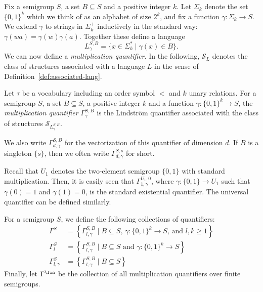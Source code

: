 \documentclass[a4paper,UKenglish,cleveref, autoref, thm-restate, anonymous]{lipics-v2021}
\begin{document}
Fix a semigroup $S$, a set $B \subseteq S$ and a positive integer $k$.  Let $\Sigma_k$ denote the set $\{0,1\}^k$ which we think of as an alphabet of size $2^k$, and fix a function $\gamma: \Sigma_k \rightarrow S$.  We extend $\gamma$ to strings in $\Sigma_k^+$ inductively in the standard way: $\gamma(wa) = \gamma(w)\gamma(a)$.  Together these define a language
$$L^{S,B}_{\gamma} = \{ x \in \Sigma_k^* \mid \gamma(x) \in B\}.$$
We can now define a \emph{multiplication quantifier}.  In the following, $\mathcal{S}_L$ denotes the class of structures associated with a language $L$ in the sense of Definition~\ref{def:associated-lang}.
\begin{definition}\label{def:multquant}
Let $\tau$ be a vocabulary including an order symbol $<$ and $k$ unary relations.
For a semigroup $S$, a set $B \subseteq S$, a positive integer $k$ and a function $\gamma: \{0,1\}^k \rightarrow S$, the \emph{multiplication quantifier} $\Gamma_{\gamma}^{S,B}$ is the Lindstr\"om quantifier associated with the class of structures $\mathcal{S}_{L^{S,B}_{\gamma}}$.

We also write $\Gamma_{d,\gamma}^{S,B}$ for the vectorization of this quantifier of dimension $d$. If $B$ is a singleton $\{s\}$, then we often write $\Gamma^{S,s}_{d,\gamma}$ for short.
\end{definition}

Recall that $U_1$ denotes the two-element semigroup $\{0,1\}$ with standard multiplication.  Then, it is easily seen that $\Gamma^{U_1,0}_{1,\gamma}$,  where $\gamma : \{0,1\} \rightarrow U_1$ such that $\gamma(0) = 1$ and $\gamma(1) = 0$, is the standard existential quantifier.  The universal quantifier can be defined similarly.


\begin{definition}
    For a semigroup $S$, we define the following collections of quantifiers: 
    \begin{align*}
        \Gamma^S &= \left\{\Gamma^{S,B}_{l,\gamma} \mid B \subseteq S \text{, } \gamma : \{0,1\}^k \rightarrow S \text{, and } l,k \geq 1\right\}\\
        \Gamma^S_{l} &= \left\{\Gamma^{S,B}_{l,\gamma} \mid B \subseteq S \text{ and } \gamma : \{0,1\}^k \rightarrow S\right\}\\
        \Gamma^S_{l,\gamma} &= \left\{\Gamma^{S,B}_{l,\gamma} \mid B \subseteq S\right\}
    \end{align*}
    Finally, let $\Gamma^{\fin}$ be the collection of all multiplication quantifiers over finite semigroups.
\end{definition}
\end{document}
